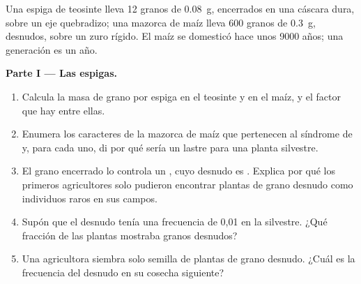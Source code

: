 \begin{problem}
\label{pb:g12:domesticated-plants:1}
Una espiga de teosinte lleva 12 granos de \qty{0.08}{g}, encerrados en
una cáscara dura, sobre un eje quebradizo; una mazorca de maíz lleva
600 granos de \qty{0.3}{g}, desnudos, sobre un zuro rígido. El maíz se
domesticó hace unos 9000 años; una generación es un año.

\medskip
\noindent\textbf{Parte I --- Las espigas.}
\begin{enumerate}
  \item Calcula la masa de grano por espiga en el teosinte y en el
        maíz, y el factor que hay entre ellas.
  \item Enumera los caracteres de la mazorca de maíz que pertenecen al
        síndrome de  y, para cada uno, di por qué sería un
        lastre para una planta silvestre.
  \item El grano encerrado lo controla un , cuyo  desnudo es
        . Explica por qué los primeros agricultores solo
        pudieron encontrar plantas de grano desnudo como individuos
        raros en sus campos.
  \item Supón que el  desnudo tenía una frecuencia de 0,01 en la
         silvestre. ¿Qué fracción de las plantas mostraba
        granos desnudos?
  \item Una agricultora siembra solo semilla de plantas de grano
        desnudo. ¿Cuál es la frecuencia del  desnudo en su cosecha
        siguiente?
\end{enumerate}


\end{problem}
